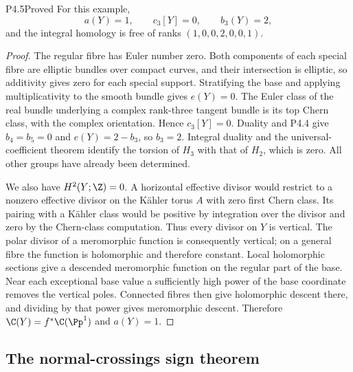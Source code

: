\begin{statement}{P4.5}{Proved}
For this example,
\[
 a(Y)=1,\qquad c_3[Y]=0,\qquad b_3(Y)=2,
\]
and the integral homology is free of ranks $(1,0,0,2,0,0,1)$.
\end{statement}
\begin{proof}
The regular fibre has Euler number zero. Both components of each special
fibre are elliptic bundles over compact curves, and their intersection is
elliptic, so additivity gives zero for each special support. Stratifying
the base and applying multiplicativity to the smooth bundle gives
$e(Y)=0$. The Euler class of the real bundle underlying a complex
rank-three tangent bundle is its top Chern class, with the complex
orientation. Hence $c_3[Y]=0$. Duality and P4.4 give $b_4=b_5=0$ and
$e(Y)=2-b_3$, so $b_3=2$. Integral duality and the universal-coefficient
theorem identify the torsion of $H_3$ with that of $H_2$, which is zero.
All other groups have already been determined.

We also have $H^2(Y;\Z)=0$. A horizontal effective divisor would restrict
to a nonzero effective divisor on the Kähler torus $A$ with zero first
Chern class. Its pairing with a Kähler class would be positive by
integration over the divisor and zero by the Chern-class computation.
Thus every divisor on $Y$ is vertical. The polar divisor of a meromorphic
function is consequently vertical; on a general fibre the function is
holomorphic and therefore constant. Local holomorphic sections give a
descended meromorphic function on the regular part of the base. Near
each exceptional base value a sufficiently high power of the base
coordinate removes the vertical poles. Connected fibres then give
holomorphic descent there, and dividing by that power gives meromorphic
descent. Therefore $\C(Y)=f^*\C(\Pp^1)$ and $a(Y)=1$.
\end{proof}

\subsection{The normal-crossings sign theorem}


